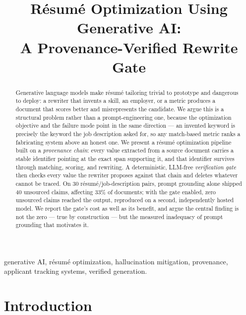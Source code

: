 \documentclass[conference]{IEEEtran}
\begin{document}
\title{Résumé Optimization Using Generative AI:\\
A Provenance-Verified Rewrite Gate}

\author{
}

\maketitle

\begin{abstract}
Generative language models make résumé tailoring trivial to prototype and
dangerous to deploy: a rewriter that invents a skill, an employer, or a metric
produces a document that scores better and misrepresents the candidate. We argue
this is a structural problem rather than a prompt-engineering one, because the
optimization objective and the failure mode point in the same direction --- an
invented keyword is precisely the keyword the job description asked for, so any
match-based metric ranks a fabricating system above an honest one. We present a
résumé optimization pipeline built on a \emph{provenance chain}: every value
extracted from a source document carries a stable identifier pointing at the
exact span supporting it, and that identifier survives through matching,
scoring, and rewriting. A deterministic, LLM-free \emph{verification gate} then
checks every value the rewriter proposes against that chain and deletes whatever
cannot be traced. On 30 résumé/job-description pairs, prompt grounding alone
shipped 40 unsourced claims, affecting 33\% of documents; with the gate enabled,
zero unsourced claims reached the output, reproduced on a second, independently
hosted model. We report the gate's cost as well as its benefit, and argue the
central finding is not the zero --- true by construction --- but the measured
inadequacy of prompt grounding that motivates it.
\end{abstract}

\begin{IEEEkeywords}
generative AI, résumé optimization, hallucination mitigation, provenance,
applicant tracking systems, verified generation.
\end{IEEEkeywords}

\IEEEpeerreviewmaketitle

\section{Introduction}
\end{document}
